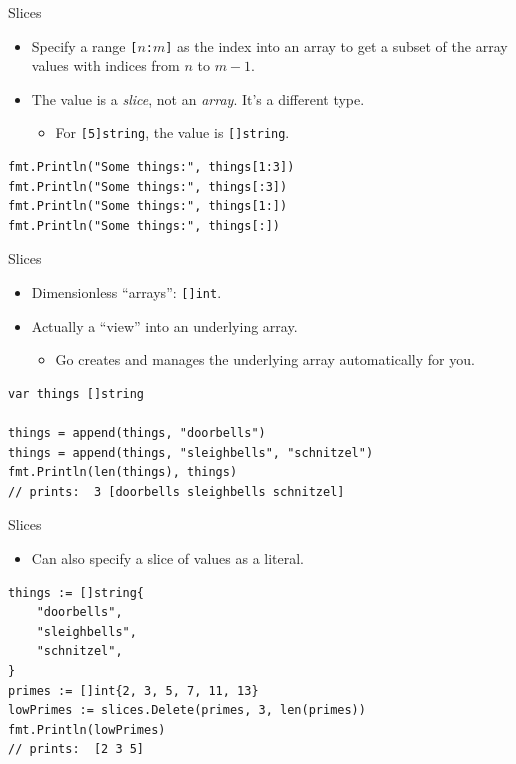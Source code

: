 \documentclass[pdf]{beamer}
\newcommand\z[1]{\texttt{#1}}
\newcommand\keyword[1]{{\color{blue}\z{#1}}}
\begin{document}
\begin{frame}[fragile]{Slices}
	\begin{itemize}
		\item Specify a range \z{[}$n$\z{:}$m$\z{]} as the index into an array to get a subset of the array values
			with indices from $n$ to $m-1$.
		\item The value is a \emph{slice}, not an \emph{array}. It's a different type.
		\begin{itemize}
			\item For \z{[5]}\keyword{string}, the value is \z{[]}\keyword{string}.
		\end{itemize}
	\end{itemize}
\begin{lstlisting}
fmt.Println("Some things:", things[1:3])
fmt.Println("Some things:", things[:3])
fmt.Println("Some things:", things[1:])
fmt.Println("Some things:", things[:])
\end{lstlisting}
\end{frame}
\begin{frame}[fragile]{Slices}
	\begin{itemize}
		\item Dimensionless ``arrays'': \z{[]}\keyword{int}.
		\item Actually a ``view'' into an underlying array.
			\begin{itemize}
				\item Go creates and manages the underlying array automatically for you.
			\end{itemize}
	\end{itemize}
\begin{lstlisting}
var things []string

things = append(things, "doorbells")
things = append(things, "sleighbells", "schnitzel")
fmt.Println(len(things), things) 
// prints:  3 [doorbells sleighbells schnitzel]
\end{lstlisting}
\end{frame}

\begin{frame}[fragile]{Slices}
	\begin{itemize}
		\item Can also specify a slice of values as a literal.
	\end{itemize}
\begin{lstlisting}
things := []string{
    "doorbells",
    "sleighbells",
    "schnitzel",
}
primes := []int{2, 3, 5, 7, 11, 13}
lowPrimes := slices.Delete(primes, 3, len(primes))
fmt.Println(lowPrimes)
// prints:  [2 3 5]
\end{lstlisting}
\end{frame}
\end{document}
